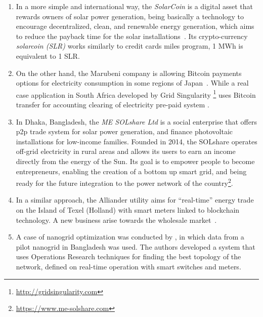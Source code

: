 \begin{enumerate}[label={\textcolor{gray}{(\arabic*)}}, font={\small\bfseries}]

    \item\label{solarcoin} In a more simple and international way, the \emph{SolarCoin} is a digital asset that rewards owners of solar power generation, being basically a technology to encourage decentralized, clean, and renewable energy generation,
    which aims to reduce the payback time for the solar installations~\cite{mit-dci}.
    Its crypto-currency \emph{solarcoin (SLR)} works similarly to credit cards miles program, 1 MWh is equivalent to 1 SLR.
    
    \item\label{bitcoin} On the other hand, the Marubeni company is allowing Bitcoin payments options for electricity consumption in some regions of Japan~\cite{groarke2016}.
    While a real case application in South Africa developed by Grid Singularity%
    \footnote{\href{http://gridsingularity.com}{http://gridsingularity.com}}
    uses Bitcoin transfer for accounting clearing of electricity pre-paid system \cite{video:grid}.
    
    \item\label{solshare} In Dhaka, Bangladesh, the \emph{ME SOLshare Ltd} is a social enterprise that offers \gls{p2p} trade system for solar power generation, and finance photovoltaic installations for low-income families.
    Founded in 2014, the SOLshare operates off-grid electricity in rural areas and allows its users to earn an income directly from the energy of the Sun.
    Its goal is to empower people to become entrepreneurs, enabling the creation of a bottom up smart grid, and being ready for the future integration to the power network of the country\footnote{\href{https://www.me-solshare.com/}{https://www.me-solshare.com}}.
    
    \item\label{alliander} In a similar approach, the Alliander utility aims for ``real-time'' energy trade on the Island of Texel (Holland) with smart meters linked to blockchain technology. A new business arise towards the wholesale market~\cite{groarke2016}.
    
    \item\label{nanogrid} A case of nanogrid optimization was conducted by , in which data from a pilot nanogrid in Bangladesh was used. The authors developed a system that uses Operations Research techniques for finding the best topology of the network, defined on real-time operation with smart switches and meters.


\end{enumerate}
